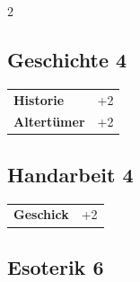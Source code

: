 \begin{multicols}{2}
\begin{tcolorbox}

\end{tcolorbox}

\begin{tcolorbox}
    \subsection*{Geschichte \hfill \small{4 }}
    \tcblower




\begin{tabular}{@{}ll@{}}
    \textbf{Historie} & +2\\
    \textbf{Altertümer} & +2\\
\end{tabular}


\end{tcolorbox}

\begin{tcolorbox}
    \subsection*{Handarbeit \hfill \small{4 }}
    \tcblower




\begin{tabular}{@{}ll@{}}
    \textbf{Geschick} & +2\\
\end{tabular}


\end{tcolorbox}

\begin{tcolorbox}
    \subsection*{Esoterik \hfill \small{6 }}
    \tcblower





\end{tcolorbox}
\end{multicols}
